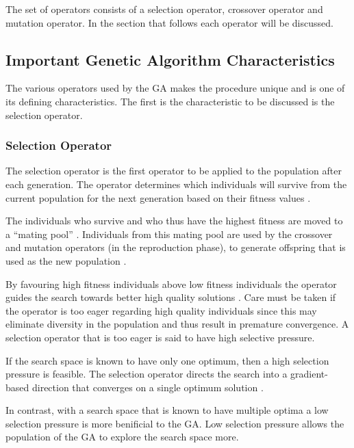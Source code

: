 The set of operators consists of a selection operator, crossover operator and mutation operator\cite{SelfAdaptiveGA,MultiPopGA}. In the section that follows each operator will be discussed.

\subsection{Important Genetic Algorithm Characteristics}
The various operators used by the GA makes the procedure unique and is one of its defining characteristics. The first is the characteristic to be discussed is the selection operator.

\subsubsection{Selection Operator}
The selection operator is the first operator to be applied to the population after each generation. The operator determines which individuals will survive from the current population for the next generation based on their fitness values \cite{CoactiveFuzzyGA,CombinedBranchBoundGA,ConstrainedGA}.

The individuals who survive and who thus have the highest fitness are moved to a ``mating pool'' \cite{HumanPassiveGA}. Individuals from this mating pool are used by the crossover and mutation operators (in the reproduction phase), to generate offspring that is used as the new population \cite{AdaptiveSAGA,AcceleratingGA}.

By favouring high fitness individuals above low fitness individuals the operator guides the search towards better high quality solutions \cite{ConstrainedGA}. Care must be taken if the operator is too eager regarding high quality individuals since this may eliminate diversity in the population and thus result in premature convergence\cite{ConstrainedGA}. A selection operator that is too eager is said to have high selective pressure.

If the search space is known to have only one optimum, then a high selection pressure is feasible\cite{ConstrainedGA}. The selection operator directs the search into a gradient-based direction that converges on a single optimum solution \cite{ConstrainedGA}. 

In contrast, with a search space that is known to have multiple optima a low selection pressure is more benificial to the GA\cite{ConstrainedGA}. Low selection pressure allows the population of the GA to explore the search space more\cite{ConstrainedGA}.

